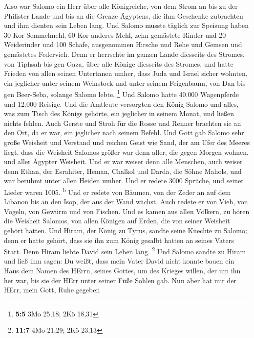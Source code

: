  Also war Salomo ein Herr über alle Königreiche, von dem
Strom an bis zu der Philister Lande und bis an die Grenze Ägyptens, die
ihm Geschenke zubrachten und ihm dienten sein Leben lang. 
Und Salomo musste täglich zur Speisung haben 30 Kor Semmelmehl, 60 Kor
anderes Mehl,  zehn gemästete Rinder und 20 Weiderinder
und 100 Schafe, ausgenommen Hirsche und Rehe und Gemsen und gemästetes
Federvieh.  Denn er herrschte im ganzen Lande diesseits
des Stromes, von Tiphsah bis gen Gaza, über alle Könige diesseits des
Stromes, und hatte Frieden von allen seinen Untertanen umher,
 dass Juda und Israel sicher wohnten, ein jeglicher unter
seinem Weinstock und unter seinem Feigenbaum, von Dan bis gen Beer-Seba,
solange Salomo lebte. \footnote{\textbf{5:5} 3Mo 25,18; 2Kö 18,31}
 Und Salomo hatte 40.000 Wagenpferde und 12.000 Reisige.
 Und die Amtleute versorgten den König Salomo und alles,
was zum Tisch des Königs gehörte, ein jeglicher in seinem Monat, und
ließen nichts fehlen.  Auch Gerste und Stroh für die Rosse
und Renner brachten sie an den Ort, da er war, ein jeglicher nach seinem
Befehl.  Und Gott gab Salomo sehr große Weisheit und
Verstand und reichen Geist wie Sand, der am Ufer des Meeres liegt,
 dass die Weisheit Salomos größer war denn aller, die
gegen Morgen wohnen, und aller Ägypter Weisheit.  Und er
war weiser denn alle Menschen, auch weiser denn Ethan, der Esrahiter,
Heman, Chalkol und Darda, die Söhne Mahols, und war berühmt unter allen
Heiden umher.  Und er redete 3000 Sprüche, und seiner
Lieder waren 1005. \textsuperscript{b}  Und er redete von
Bäumen, von der Zeder an auf dem Libanon bis an den Isop, der aus der
Wand wächst. Auch redete er von Vieh, von Vögeln, von Gewürm und von
Fischen.  Und es kamen aus allen Völkern, zu hören die
Weisheit Salomos, von allen Königen auf Erden, die von seiner Weisheit
gehört hatten.  Und Hiram, der König zu Tyrus, sandte
seine Knechte zu Salomo; denn er hatte gehört, dass sie ihn zum König
gesalbt hatten an seines Vaters Statt. Denn Hiram liebte David sein
Leben lang. \footnote{\textbf{11:7} 4Mo 21,29; 2Kö 23,13}
 Und Salomo sandte zu Hiram und ließ ihm sagen:
 Du weißt, dass mein Vater David nicht konnte bauen ein
Haus dem Namen des HErrn, seines Gottes, um des Krieges willen, der um
ihn her war, bis sie der HErr unter seiner Füße Sohlen gab.
 Nun aber hat mir der HErr, mein Gott, Ruhe gegeben
